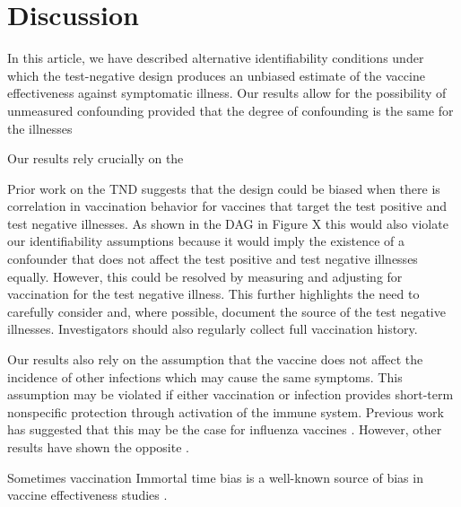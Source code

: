 \documentclass[11pt]{article}
\begin{document}
\section{Discussion} \label{sec:discussion}

In this article, we have described alternative identifiability conditions under which the test-negative design produces an unbiased estimate of the vaccine effectiveness against symptomatic illness. Our results allow for the possibility of unmeasured confounding provided that the degree of confounding is the same for the illnesses 


Our results rely crucially on the

Prior work on the TND suggests that the design could be biased when there is correlation in vaccination behavior for vaccines that target the test positive and test negative illnesses. As shown in the DAG in Figure X this would also violate our identifiability assumptions because it would imply the existence of a confounder that does not affect the test positive and test negative illnesses equally. However, this could be resolved by measuring and adjusting for vaccination for the test negative illness. This further highlights the need to carefully consider and, where possible, document the source of the test negative illnesses. Investigators should also regularly collect full vaccination history.

Our results also rely on the assumption that the vaccine does not affect the incidence of other infections which may cause the same symptoms. This assumption may be violated if either vaccination or infection provides short-term nonspecific protection through activation of the immune system. Previous work has suggested that this may be the case for influenza vaccines \cite{cowling_increased_2012}. However, other results have shown the opposite \cite{sundaram_influenza_2013}.

Sometimes vaccination 
Immortal time bias is a well-known source of bias in vaccine effectiveness studies \cite{suissa_immortal_2008}. 
\end{document}
